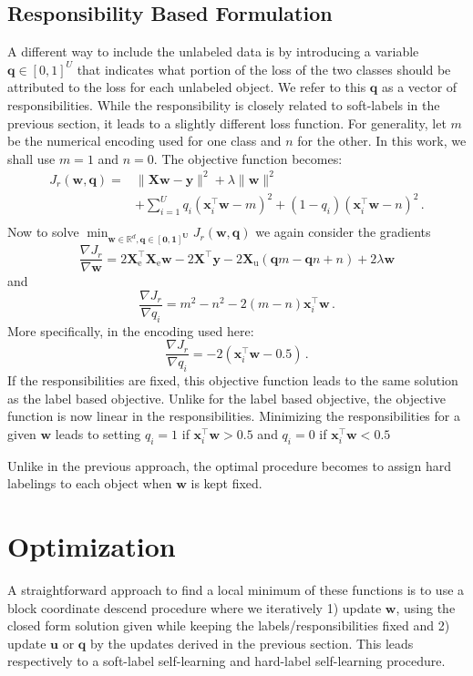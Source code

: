 \documentclass[twoside]{memoir}\usepackage[]{graphicx}\usepackage{xcolor}
\begin{document}
\subsection{Responsibility Based Formulation}
A different way to include the unlabeled data is by introducing a variable $\mathbf{q} \in [0,1]^U$ that indicates what portion of the loss of the two classes should be attributed to the loss for each unlabeled object. We refer to this $\mathbf{q}$ as a vector of responsibilities. While the responsibility is closely related to soft-labels in the previous section, it leads to a slightly different loss function. For generality, let $m$ be the numerical encoding used for one class and $n$ for the other. In this work, we shall use $m=1$ and $n=0$. The objective function becomes:
\begin{align}
J_r(\mathbf{w},\mathbf{q}) = & \| \mathbf{X} \mathbf{w}-\mathbf{y} \|^2 + \lambda \|\mathbf{w} \|^2 \nonumber \\
& + \sum_{i=1}^{U}  q_i (\mathbf{x}_i^\top \mathbf{w} - m)^2  + (1-q_i) (\mathbf{x}_i^\top \mathbf{w} - n)^2 \,. \nonumber \\ \nonumber
\end{align}
Now to solve $\min_{\mathbf{w} \in \mathbb{R}^d, \mathbf{\mathbf{q} \in [0,1]^U}} J_r(\mathbf{w},\mathbf{q})$ we again consider the gradients
$$
\frac{\nabla J_r}{\nabla \mathbf{w}} = 2 \mathbf{X}^\top_\text{e} \mathbf{X}_\text{e} \mathbf{w} - 2 \mathbf{X}^\top \mathbf{y}  - 2 \mathbf{X}_\text{u} (\mathbf{q} m - \mathbf{q} n + n ) + 2 \lambda \mathbf{w}
$$
and
$$
\frac{\nabla J_r}{\nabla q_i} = m^2 - n^2 - 2 (m-n) \mathbf{x}_i^\top \mathbf{w} \,.
$$
More specifically, in the encoding used here:
$$
\frac{\nabla J_r}{\nabla q_i} = - 2 (\mathbf{x}_i^\top \mathbf{w}-0.5) \,.
$$
If the responsibilities are fixed, this objective function leads to the same solution as the label based objective. Unlike for the label based objective, the objective function is now linear in the responsibilities. Minimizing the responsibilities for a given $\mathbf{w}$ leads to setting $q_i=1$ if  $\mathbf{x}_i^\top \mathbf{w}>0.5$ and $q_i=0$ if $\mathbf{x}_i^\top \mathbf{w}<0.5$

Unlike in the previous approach, the optimal procedure becomes to assign hard labelings to each object when $\mathbf{w}$ is kept fixed.

\section{Optimization}
A straightforward approach to find a local minimum of these functions is to use a block coordinate descend procedure where we iteratively 1) update $\mathbf{w}$, using the closed form solution given while keeping the labels/responsibilities fixed and 2) update $\mathbf{u}$ or $\mathbf{q}$ by the updates derived in the previous section. This leads respectively to a soft-label self-learning and hard-label self-learning procedure.
\end{document}
